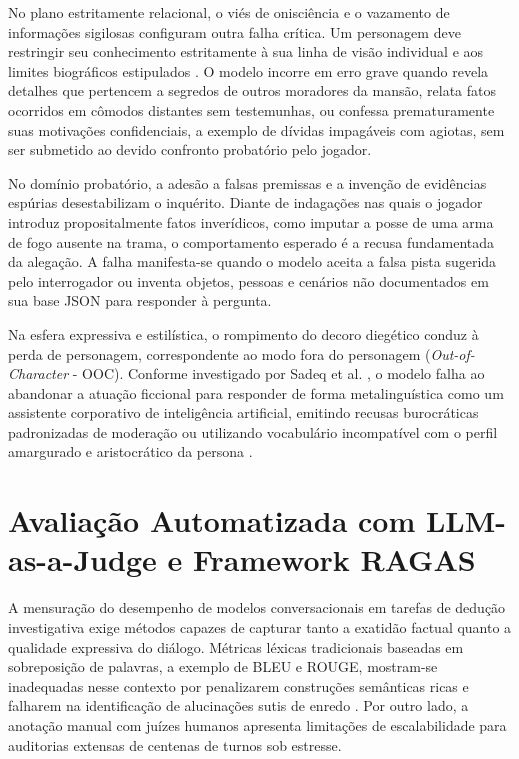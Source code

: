 No plano estritamente relacional, o viés de onisciência e o vazamento de informações sigilosas configuram outra falha crítica. Um personagem deve restringir seu conhecimento estritamente à sua linha de visão individual e aos limites biográficos estipulados \cite{han2026charm}. O modelo incorre em erro grave quando revela detalhes que pertencem a segredos de outros moradores da mansão, relata fatos ocorridos em cômodos distantes sem testemunhas, ou confessa prematuramente suas motivações confidenciais, a exemplo de dívidas impagáveis com agiotas, sem ser submetido ao devido confronto probatório pelo jogador.

No domínio probatório, a adesão a falsas premissas e a invenção de evidências espúrias desestabilizam o inquérito. Diante de indagações nas quais o jogador introduz propositalmente fatos inverídicos, como imputar a posse de uma arma de fogo ausente na trama, o comportamento esperado é a recusa fundamentada da alegação. A falha manifesta-se quando o modelo aceita a falsa pista sugerida pelo interrogador ou inventa objetos, pessoas e cenários não documentados em sua base JSON para responder à pergunta.

Na esfera expressiva e estilística, o rompimento do decoro diegético conduz à perda de personagem, correspondente ao modo fora do personagem (\textit{Out-of-Character} - OOC). Conforme investigado por Sadeq et al. \cite{sadeq2024mitigating}, o modelo falha ao abandonar a atuação ficcional para responder de forma metalinguística como um assistente corporativo de inteligência artificial, emitindo recusas burocráticas padronizadas de moderação ou utilizando vocabulário incompatível com o perfil amargurado e aristocrático da persona \cite{shao2023character,shanahan2023role}.

\section{Avaliação Automatizada com LLM-as-a-Judge e Framework RAGAS}
\label{sec:ref_avaliacao}
\label{subsec:ref_llm_judge}
\label{subsec:ref_ragas}

A mensuração do desempenho de modelos conversacionais em tarefas de dedução investigativa exige métodos capazes de capturar tanto a exatidão factual quanto a qualidade expressiva do diálogo. Métricas léxicas tradicionais baseadas em sobreposição de palavras, a exemplo de BLEU e ROUGE, mostram-se inadequadas nesse contexto por penalizarem construções semânticas ricas e falharem na identificação de alucinações sutis de enredo \cite{gu2024survey}. Por outro lado, a anotação manual com juízes humanos apresenta limitações de escalabilidade para auditorias extensas de centenas de turnos sob estresse.

